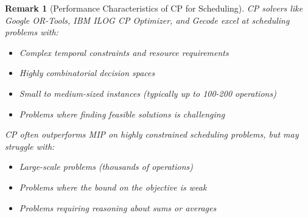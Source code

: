 \documentclass{article}
\newtheorem{remark}{Remark}
\theoremstyle{definition}
\begin{document}
\begin{remark}[Performance Characteristics of CP for Scheduling]
CP solvers like Google OR-Tools, IBM ILOG CP Optimizer, and Gecode excel at scheduling problems with:
\begin{itemize}
    \item Complex temporal constraints and resource requirements
    \item Highly combinatorial decision spaces
    \item Small to medium-sized instances (typically up to 100-200 operations)
    \item Problems where finding feasible solutions is challenging
\end{itemize}

CP often outperforms MIP on highly constrained scheduling problems, but may struggle with:
\begin{itemize}
    \item Large-scale problems (thousands of operations)
    \item Problems where the bound on the objective is weak
    \item Problems requiring reasoning about sums or averages
\end{itemize}
\end{remark}
\end{document}
